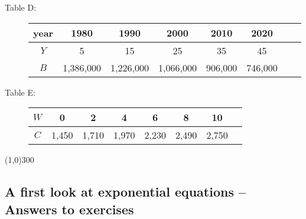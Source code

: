 \begin{description}
\item[\quad Table D: \quad]  \begin{tabular} {|c| |c|c |c|c |c|c |c|}\hline
year & 1980 & 1990 & 2000 & 2010 & 2020\\ \hline
$Y$ & 5 & 15 & 25 & 35 & 45  \\ \hline
$B$ & 1,386,000 & 1,226,000 & 1,066,000 & 906,000 & 746,000 \\ \hline
\end{tabular}
\end{description}

\begin{description}
\item[\quad Table E: \quad] \begin{tabular} {|c| |c|c |c|c |c|c |c|}\hline
$W$ & 0 & 2 & 4 & 6 & 8 & 10\\ \hline
$C$ & 1,450 & 1,710 & 1,970 & 2,230 & 2,490 & 2,750  \\ \hline
\end{tabular}
\end{description}
\bigskip

\begin{center}
\line(1,0){300} %
\end{center}

\subsection{A first look at exponential equations -- Answers to exercises} %

